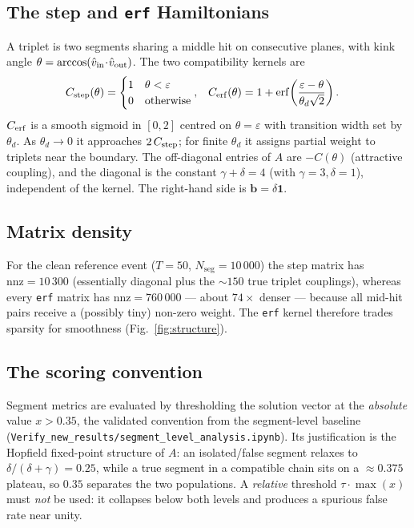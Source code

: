 \documentclass[11pt,a4paper]{article}
\newcommand{\eps}{\varepsilon}
\newcommand{\thd}{\theta_d}
\newcommand{\ntrk}{T}
\newcommand{\Nseg}{N_{\mathrm{seg}}}
\newcommand{\codepath}[1]{\texttt{#1}}
\begin{document}
\subsection{The step and \texttt{erf} Hamiltonians}
A triplet is two segments sharing a middle hit on consecutive planes, with kink angle
$\theta=\arccos(\hat v_{\rm in}\!\cdot\!\hat v_{\rm out})$. The two compatibility kernels
are
\begin{align}
  C_{\rm step}(\theta) &= \begin{cases} 1 & \theta<\eps \\ 0 & \text{otherwise} \end{cases},
  &
  C_{\rm erf}(\theta) &= 1 + \mathrm{erf}\!\left(\frac{\eps-\theta}{\thd\sqrt2}\right).
\end{align}
$C_{\rm erf}$ is a smooth sigmoid in $[0,2]$ centred on $\theta=\eps$ with transition
width set by $\thd$. As $\thd\to0$ it approaches $2\,C_{\rm step}$; for finite $\thd$ it
assigns partial weight to triplets near the boundary. The off-diagonal entries of $A$ are
$-C(\theta)$ (attractive coupling), and the diagonal is the constant $\gamma+\delta=4$
(with $\gamma=3,\delta=1$), independent of the kernel. The right-hand side is
$\mathbf{b}=\delta\mathbf{1}$.

\subsection{Matrix density}
For the clean reference event ($\ntrk=50$, $\Nseg=10\,000$) the step matrix has
$\mathrm{nnz}=10\,300$ (essentially diagonal plus the $\sim\!150$ true triplet couplings),
whereas every \texttt{erf} matrix has $\mathrm{nnz}=760\,000$ --- about $74\times$ denser
--- because all mid-hit pairs receive a (possibly tiny) non-zero weight. The \texttt{erf}
kernel therefore trades sparsity for smoothness (Fig.~\ref{fig:structure}).

\subsection{The scoring convention}
\label{sec:theory:thresh}
Segment metrics are evaluated by thresholding the solution vector at the
\emph{absolute} value $x>0.35$, the validated convention from the segment-level
baseline (\codepath{Verify\_new\_results/segment\_level\_analysis.ipynb}). Its
justification is the Hopfield fixed-point structure of $A$: an isolated/false segment
relaxes to $\delta/(\delta+\gamma)=0.25$, while a true segment in a compatible chain sits
on a $\approx0.375$ plateau, so $0.35$ separates the two populations. A \emph{relative}
threshold $\tau\cdot\max(x)$ must \emph{not} be used: it collapses below both levels and
produces a spurious false rate near unity.
\end{document}
